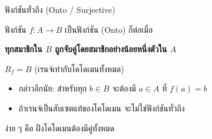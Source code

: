\documentclass[11pt, aspectratio=169]{beamer}
\begin{document}
\begin{frame}{ฟังก์ชันทั่วถึง (Onto / Surjective)}
  \begin{explanation}[นิยาม]
    ฟังก์ชัน $f: A \to B$ เป็นฟังก์ชัน  (Onto) ก็ต่อเมื่อ

    \medskip
    \textbf{ทุกสมาชิกใน $B$ ถูกจับคู่โดยสมาชิกอย่างน้อยหนึ่งตัวใน $A$}

    \medskip
    $R_f = B$ (เรนจ์เท่ากับโคโดเมนทั้งหมด)
  \end{explanation}

  \begin{itemize}
    \item กล่าวอีกนัย: สำหรับทุก $b \in B$ จะต้องมี $a \in A$ ที่ $f(a) = b$
    \item ถ้าเรนจ์เป็นสับเซตแท้ของโคโดเมน จะไม่ใช่ฟังก์ชันทั่วถึง
  \end{itemize}

  \begin{intuition}[สังเกต]
    ง่าย ๆ คือ ฝั่งโคโดเมนต้องมีคู่ทั้งหมด
  \end{intuition}
\end{frame}
\end{document}
